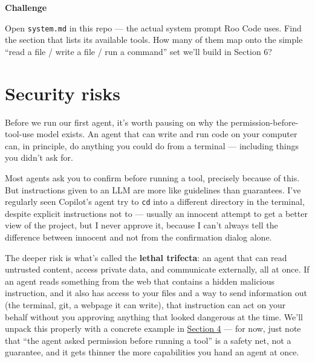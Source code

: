 \documentclass[
  letterpaper,
  DIV=11,
  numbers=noendperiod]{scrreprt}
\begin{document}
\begin{tcolorbox}[enhanced jigsaw, toprule=.15mm, rightrule=.15mm, left=2mm, leftrule=.75mm, breakable, opacityback=0, arc=.35mm, colframe=quarto-callout-important-color-frame, bottomrule=.15mm, colback=white]
\begin{minipage}[t]{5.5mm}
\textcolor{quarto-callout-important-color}{\faExclamation}
\end{minipage}%
\begin{minipage}[t]{\textwidth - 5.5mm}

\vspace{-3mm}\textbf{Challenge}\vspace{3mm}

Open \texttt{system.md} in this repo --- the actual system prompt Roo
Code uses. Find the section that lists its available tools. How many of
them map onto the simple ``read a file / write a file / run a command''
set we'll build in Section 6?

\end{minipage}%
\end{tcolorbox}

\chapter{Security risks}\label{security-risks}

Before we run our first agent, it's worth pausing on why the
permission-before-tool-use model exists. An agent that can write and run
code on your computer can, in principle, do anything you could do from a
terminal --- including things you didn't ask for.

Most agents ask you to confirm before running a tool, precisely because
of this. But instructions given to an LLM are more like guidelines than
guarantees. I've regularly seen Copilot's agent try to \texttt{cd} into
a different directory in the terminal, despite explicit instructions not
to --- usually an innocent attempt to get a better view of the project,
but I never approve it, because I can't always tell the difference
between innocent and not from the confirmation dialog alone.

The deeper risk is what's called the \textbf{lethal trifecta}: an agent
that can read untrusted content, access private data, and communicate
externally, all at once. If an agent reads something from the web that
contains a hidden malicious instruction, and it also has access to your
files and a way to send information out (the terminal, git, a webpage it
can write), that instruction can act on your behalf without you
approving anything that looked dangerous at the time. We'll unpack this
properly with a concrete example in
\href{../section-4-security-privacy/01-security-risk-examples.qmd}{Section
4} --- for now, just note that ``the agent asked permission before
running a tool'' is a safety net, not a guarantee, and it gets thinner
the more capabilities you hand an agent at once.
\end{document}
